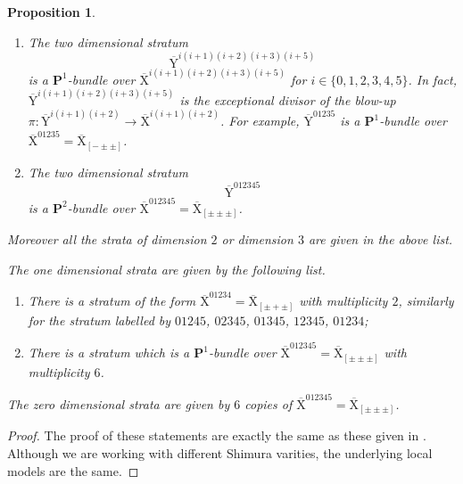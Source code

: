\documentclass[10pt]{amsart}
\numberwithin{equation}{section}
\theoremstyle{plain}
\newtheorem{proposition}[theorem]{Proposition}
\numberwithin{equation}{section}
\theoremstyle{definition}
\theoremstyle{remark}
\def\undlamb{\underline{\lambda}}
\def\calO{\mathcal{O}}
\def\PP{\mathbf{P}}
\def\rmX{\mathrm{X}}
\def\rmXbar{\overline{\rmX}}
\def\rmY{\mathrm{Y}}
\def\rmYbar{\overline{\rmY}}
\begin{document}
\begin{proposition}
\begin{enumerate}
\item The two dimensional stratum $$\rmYbar^{i(i+1)(i+2)(i+3)(i+5)}$$
is a $\PP^{1}$-bundle over $\rmXbar^{i(i+1)(i+2)(i+3)(i+5)}$ for $i\in\{0, 1, 2, 3, 4, 5\}$. In fact, $\rmYbar^{i(i+1)(i+2)(i+3)(i+5)}$
is the exceptional divisor of the blow-up 
$\pi: \rmYbar^{i(i+1)(i+2)}\rightarrow \rmXbar^{i(i+1)(i+2)}$. For example, $\rmYbar^{01235}$ is a $\PP^{1}$-bundle over $\rmXbar^{01235}=\rmXbar_{[-\pm\pm]}$.

\item The two dimensional stratum 
\begin{equation*}
\rmYbar^{012345}
\end{equation*}
is a $\PP^{2}$-bundle over $\rmXbar^{012345}=\rmXbar_{[\pm\pm\pm]}$.
\end{enumerate}
Moreover all the strata of dimension $2$ or dimension $3$ are given in the above list.  


The one dimensional strata are given by the following list.
\begin{enumerate}
\item There is a stratum of the form $\rmXbar^{01234}=\rmXbar_{[\pm+\pm]}$ with multiplicity $2$, similarly for the stratum labelled by $01245$, $02345$, $01345$, $12345$, $01234$;
\item There is a stratum which is a $\PP^{1}$-bundle over $\rmXbar^{012345}=\rmXbar_{[\pm\pm\pm]}$ with multiplicity $6$.
\end{enumerate}
The zero dimensional strata are given by $6$ copies of $\rmXbar^{012345}=\rmXbar_{[\pm\pm\pm]}$.
\end{proposition}

\begin{proof}
The proof of these statements are exactly the same as these given in \cite[Proposition B.39]{Liu-cubic}. Although we are working with different Shimura varities, the underlying local models are the same. 
\end{proof}
\def\calOlamb{\calO_{\undlamb}}
\end{document}
